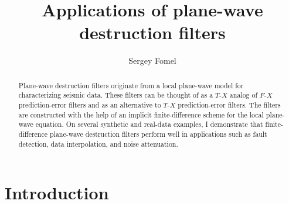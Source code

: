 



\title{Applications of plane-wave destruction filters}


\author{Sergey Fomel}

\maketitle

\begin{abstract}
  Plane-wave destruction filters originate from a local plane-wave
  model for characterizing seismic data. These filters can be thought
  of as a $T$-$X$ analog of $F$-$X$ prediction-error filters and as an
  alternative to $T$-$X$ prediction-error filters. The filters are
  constructed with the help of an implicit finite-difference scheme
  for the local plane-wave equation.  On several synthetic and
  real-data examples, I demonstrate that finite-difference plane-wave
  destruction filters perform well in applications such as fault
  detection, data interpolation, and noise attenuation.
\end{abstract}

\section{Introduction}

